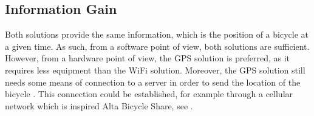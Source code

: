 \subsection{Information Gain}
Both solutions provide the same information, which is the position of a bicycle at a given time.
As such, from a software point of view, both solutions are sufficient.
However, from a hardware point of view, the GPS solution is preferred, as it requires less equipment than the WiFi solution. 
Moreover, the GPS solution still needs some means of connection to a server in order to send the location of the bicycle \citep{misc:gpsSystem}. 
This connection could be established, for example through a cellular network which is inspired Alta Bicycle Share, see .